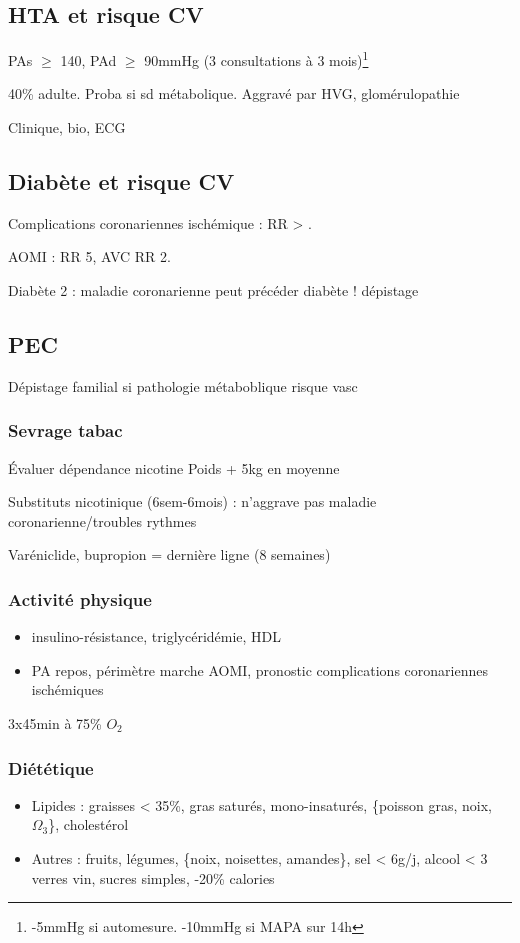 \documentclass[11pt]{article}
\begin{document}
\subsection{HTA et risque CV}
\label{sec:orgb327b89}
PAs \(\ge\) 140, PAd \(\ge\) 90mmHg (3 consultations à 3 mois)\footnote{-5mmHg si automesure. -10mmHg si MAPA sur 14h}   

40\% adulte. Proba \inc si sd métabolique. Aggravé par \acrshort{HVG}, glomérulopathie

Clinique, bio, ECG

\subsection{Diabète et risque CV}
\label{sec:orgcb7ca92}
Complications coronariennes ischémique : RR \female{} > \male.

AOMI : RR \texttimes{} 5, AVC RR \texttimes{} 2.

Diabète 2 : maladie coronarienne peut précéder diabète ! \thus dépistage

\subsection{PEC}
\label{sec:orgbda4dee}
Dépistage familial si pathologie métaboblique \inc risque vasc
\subsubsection{Sevrage tabac}
\label{sec:org8ab76fb}
Évaluer dépendance nicotine
Poids + 5kg en moyenne

Substituts nicotinique (6sem-6mois) : n'aggrave pas maladie
coronarienne/troubles rythmes

Varéniclide, bupropion = dernière ligne (8 semaines)
\subsubsection{Activité physique}
\label{sec:org719e591}
\begin{itemize}
\item \dec insulino-résistance, \dec triglycéridémie, \inc HDL
\item \dec PA repos, \inc périmètre marche AOMI, \inc pronostic complications coronariennes ischémiques
\end{itemize}

3x45min à 75\% \(O_2\)

\subsubsection{Diététique}
\label{sec:org3b8e0b9}
\begin{itemize}
\item Lipides : graisses < 35\%, \dec gras saturés, \inc mono-insaturés, \{poisson gras, noix, \(\Omega_{\text{3}}\)\}, \dec cholestérol
\item Autres : \inc fruits, légumes, \{noix, noisettes, amandes\}, sel < 6g/j, alcool
< 3 verres vin, \dec sucres simples, -20\% calories
\end{itemize}
\end{document}
